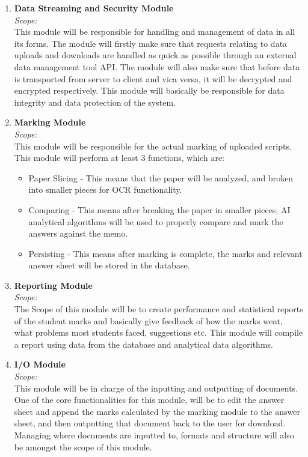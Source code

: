 \documentclass{article}
\begin{document}
\begin{enumerate}
			\item \textbf{Data Streaming and Security Module}\\
					\textit{Scope:}\\
					This module will be responsible for handling and management of data in all its forms. The module will firstly make sure that requests relating to data uploads and downloads are handled as quick as possible through an external data management tool API. The module will also make sure that before data is transported from server to client and vica versa, it will be decrypted and encrypted respectively. This module will basically be responsible for data integrity and data protection of the system.  
			
			\item \textbf{Marking Module}\\
				\textit{Scope:}\\
				This module will be responsible for the actual marking of uploaded scripts. This module will perform at least 3 functions, which are:
				\begin{itemize}
					\item Paper Slicing - This means that the paper will be analyzed, and broken into smaller pieces for OCR functionality.
					\item Comparing - This means after breaking the paper in smaller pieces, AI analytical algorithms will be used to properly compare and mark the answers against the memo.
					\item Persisting - This means after marking is complete, the marks and relevant answer sheet will be stored in the database.
				\end{itemize}
			\item \textbf{Reporting Module}\\
			
				\textit{Scope:}\\
				The Scope of this module will be to create performance and statistical reports of the student marks and basically give feedback of how the marks went, what problems most students faced, suggestions etc. This module will compile a report using data from the database and analytical data algorithms. 
			
			\item \textbf{I/O Module}\\
		
				\textit{Scope:}\\
				This module will be in charge of the inputting and outputting of documents. One of the core functionalities for this module, will be to edit the answer sheet and append the marks calculated by the marking module to the answer sheet, and then outputting that document back to the user for download. Managing where documents are inputted to, formats and structure will also be amongst the scope of this module.
			
		\end{enumerate}
\end{document}
